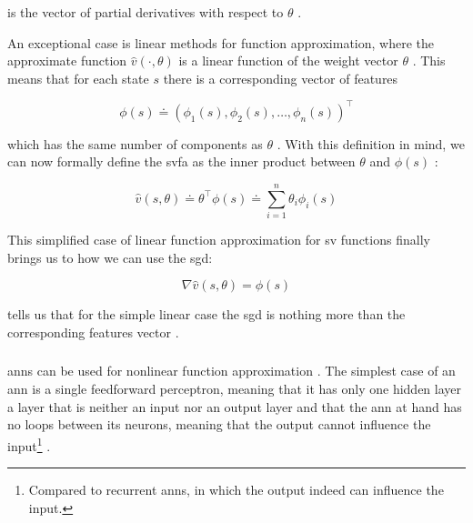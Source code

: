 is the vector of partial derivatives with respect to $\theta$ \citep[p. 195]{Sutton2017}.

An exceptional case is linear methods for function approximation, where the approximate function $\hat{v} (\cdot ,\theta)$ is a linear function of the weight vector $\theta$ \citep[p. 198]{Sutton2017}. This means that for each state $s$ there is a corresponding vector of features

\begin{equation}
	\phi (s) \doteq \left( \phi_1 (s), \phi_2 (s), \ldots, \phi_n (s) \right)^\top
\end{equation}

which has the same number of components as $\theta$ \citep[p. 198]{Sutton2017}. With this definition in mind, we can now formally define the \gls{svfa} as the inner product between $\theta$ and $\phi (s)$ \citep[p. 198]{Sutton2017}:

\begin{equation}
\label{eq:function_approximation_dot}
	\hat{v} (s,\theta) \doteq \theta^\top \phi (s) \doteq \sum_{i=1}^n \theta_i \phi_i (s)
\end{equation}

This simplified case of linear function approximation for \gls{sv} functions finally brings us to how we can use the \gls{sgd}:

\begin{equation}
\label{eq:sgd_linear}
	\nabla \hat{v} (s,\theta) = \phi (s)
\end{equation}

 tells us that for the simple linear case the \gls{sgd} is nothing more than the corresponding features vector \citep[p. 199]{Sutton2017}.

\subsubsection{}
\label{subsubsec:ann_theory}

\glspl{ann} can be used for nonlinear function approximation \citep[p. 199]{Sutton2017}. The simplest case of an \gls{ann} is a single feedforward perceptron, meaning that it has only one hidden layer \ie a layer that is neither an input nor an output layer and that the \gls{ann} at hand has no loops between its neurons, meaning that the output cannot influence the input\footnote{Compared to recurrent \glspl{ann}, in which the output indeed can influence the input.} \citep[p. 216]{Sutton2017}. 

